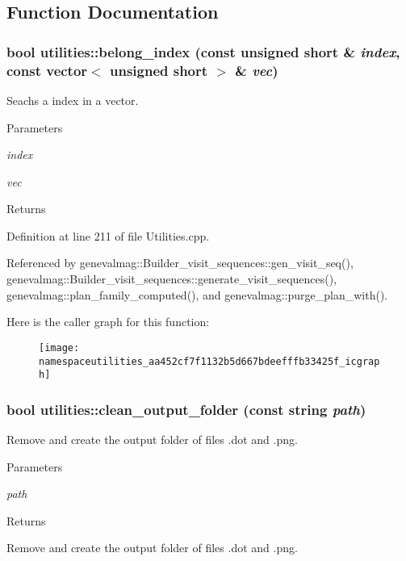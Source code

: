 \subsection{Function Documentation}
\hypertarget{namespaceutilities_aa452cf7f1132b5d667bdeefffb33425f}{
\subsubsection[{belong\_\-index}]{\setlength{\rightskip}{0pt plus 5cm}bool utilities::belong\_\-index (const unsigned short \& {\em index}, \/  const vector$<$ unsigned short $>$ \& {\em vec})}}
\label{namespaceutilities_aa452cf7f1132b5d667bdeefffb33425f}
Seachs a index in a vector. 
\begin{DoxyParams}{Parameters}
\item[{\em index}]\item[{\em vec}]\end{DoxyParams}
\begin{DoxyReturn}{Returns}

\end{DoxyReturn}


Definition at line 211 of file Utilities.cpp.



Referenced by genevalmag::Builder\_\-visit\_\-sequences::gen\_\-visit\_\-seq(), genevalmag::Builder\_\-visit\_\-sequences::generate\_\-visit\_\-sequences(), genevalmag::plan\_\-family\_\-computed(), and genevalmag::purge\_\-plan\_\-with().



Here is the caller graph for this function:\nopagebreak
\begin{figure}[H]
\begin{center}
\leavevmode
\texttt{[image: namespaceutilities\_aa452cf7f1132b5d667bdeefffb33425f\_icgraph]}
\end{center}
\end{figure}


\hypertarget{namespaceutilities_a28f2ace508b6ea5bc7af05b84f0b2487}{
\subsubsection[{clean\_\-output\_\-folder}]{\setlength{\rightskip}{0pt plus 5cm}bool utilities::clean\_\-output\_\-folder (const string {\em path})}}
\label{namespaceutilities_a28f2ace508b6ea5bc7af05b84f0b2487}
Remove and create the output folder of files .dot and .png. 
\begin{DoxyParams}{Parameters}
\item[{\em path}]\end{DoxyParams}
\begin{DoxyReturn}{Returns}

\end{DoxyReturn}
Remove and create the output folder of files .dot and .png. 

